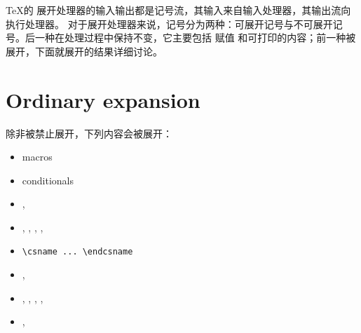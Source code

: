 \documentclass{book}
\begin{document}
\TeX 的 展开处理器的输入输出都是记号流，其输入来自输入处理器，其输出流向执行处理器。 
对于展开处理器来说，记号分为两种：可展开记号与不可展开记号。后一种在处理过程中保持不变，它主要包括 赋值 和可打印的内容；前一种被展开，下面就展开的结果详细讨论。

\section{Ordinary expansion}

除非被禁止展开，下列内容会被展开：
\begin{itemize}
\item macros\label{expand:lijst}
\item conditionals
\item {}, 
\item {}, , , 
      , 
\item \verb,\csname ... \endcsname,
\item {}, 
\item {}, , , 
      , 
\item {}, 
\end{itemize}
\end{document}
